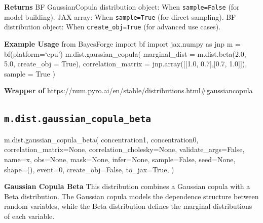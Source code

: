 \documentclass[
  letterpaper,
  DIV=11,
  numbers=noendperiod]{scrartcl}
\newenvironment{Shaded}{\begin{snugshade}}{\end{snugshade}}
\newcommand{\DecValTok}[1]{\textcolor[rgb]{0.68,0.00,0.00}{#1}}
\newcommand{\NormalTok}[1]{\textcolor[rgb]{0.00,0.23,0.31}{#1}}
\newcommand{\OperatorTok}[1]{\textcolor[rgb]{0.37,0.37,0.37}{#1}}
\newcommand{\StringTok}[1]{\textcolor[rgb]{0.13,0.47,0.30}{#1}}
\newcommand{\VariableTok}[1]{\textcolor[rgb]{0.07,0.07,0.07}{#1}}
\begin{document}
\textbf{Returns} BF GaussianCopula distribution object: When
\texttt{sample=False} (for model building). JAX array: When
\texttt{sample=True} (for direct sampling). BF distribution object: When
\texttt{create\_obj=True} (for advanced use cases).

\textbf{Example Usage} from BayesForge import bf import jax.numpy as jnp
m = bf(platform=`cpu') m.dist.gaussian\_copula( marginal\_dist =
m.dist.beta(2.0, 5.0, create\_obj = True), correlation\_matrix =
jnp.array({[}{[}1.0, 0.7{]},{[}0.7, 1.0{]}{]}), sample = True )

\textbf{Wrapper of}
https://num.pyro.ai/en/stable/distributions.html\#gaussiancopula

\subsection{\texorpdfstring{\texttt{m.dist.gaussian\_copula\_beta}}{m.dist.gaussian\_copula\_beta}}\label{gaussian_copula_beta}

\begin{Shaded}
\begin{Highlighting}[]
\NormalTok{m.dist.gaussian\_copula\_beta(}
\NormalTok{    concentration1,}
\NormalTok{    concentration0,}
\NormalTok{    correlation\_matrix}\OperatorTok{=}\VariableTok{None}\NormalTok{,}
\NormalTok{    correlation\_cholesky}\OperatorTok{=}\VariableTok{None}\NormalTok{,}
\NormalTok{    validate\_args}\OperatorTok{=}\VariableTok{False}\NormalTok{,}
\NormalTok{    name}\OperatorTok{=}\StringTok{\textquotesingle{}x\textquotesingle{}}\NormalTok{,}
\NormalTok{    obs}\OperatorTok{=}\VariableTok{None}\NormalTok{,}
\NormalTok{    mask}\OperatorTok{=}\VariableTok{None}\NormalTok{,}
\NormalTok{    infer}\OperatorTok{=}\VariableTok{None}\NormalTok{,}
\NormalTok{    sample}\OperatorTok{=}\VariableTok{False}\NormalTok{,}
\NormalTok{    seed}\OperatorTok{=}\VariableTok{None}\NormalTok{,}
\NormalTok{    shape}\OperatorTok{=}\NormalTok{(),}
\NormalTok{    event}\OperatorTok{=}\DecValTok{0}\NormalTok{,}
\NormalTok{    create\_obj}\OperatorTok{=}\VariableTok{False}\NormalTok{,}
\NormalTok{    to\_jax}\OperatorTok{=}\VariableTok{True}\NormalTok{,}
\NormalTok{)}
\end{Highlighting}
\end{Shaded}

\textbf{Gaussian Copula Beta} This distribution combines a Gaussian
copula with a Beta distribution. The Gaussian copula models the
dependence structure between random variables, while the Beta
distribution defines the marginal distributions of each variable.
\end{document}
